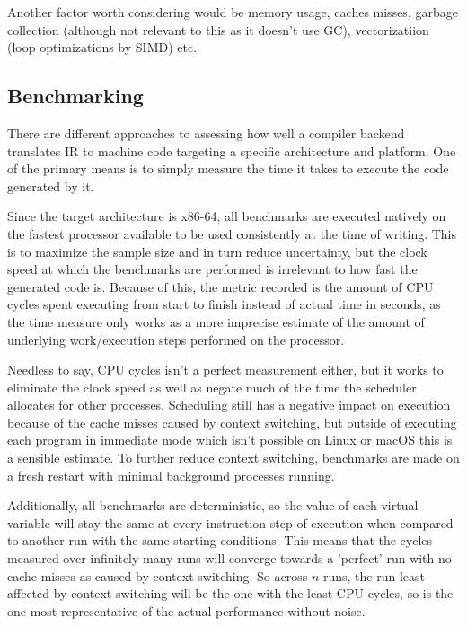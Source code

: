 \documentclass{article}
\begin{document}

Another factor worth considering would be memory usage, caches misses, garbage collection (although not relevant to this as it doesn't use GC), vectorizatiion (loop optimizations by SIMD) etc.

\newpage
\subsection{Benchmarking}


There are different approaches to assessing how well a compiler backend translates IR to machine code targeting a specific architecture and platform. One of the primary means is to simply measure the time it takes to execute the code generated by it.

Since the target architecture is x86-64, all benchmarks are executed natively on the fastest processor available to be used consistently at the time of writing. This is to maximize the sample size and in turn reduce uncertainty, but the clock speed at which the benchmarks are performed is irrelevant to how fast the generated code is. Because of this, the metric recorded is the amount of CPU cycles spent executing from start to finish instead of actual time in seconds, as the time measure only works as a more imprecise estimate of the amount of underlying work/execution steps performed on the processor.

Needless to say, CPU cycles isn't a perfect measurement either, but it works to eliminate the clock speed as well as negate much of the time the scheduler allocates for other processes. Scheduling still has a negative impact on execution because of the cache misses caused by context switching, but outside of executing each program in immediate mode which isn't possible on Linux or macOS this is a sensible estimate. To further reduce context switching, benchmarks are made on a fresh restart with minimal background processes running.

Additionally, all benchmarks are deterministic, so the value of each virtual variable will stay the same at every instruction step of execution when compared to another run with the same starting conditions. %
This means that the cycles measured over infinitely many runs will converge towards a 'perfect' run with no cache misses as caused by context switching. So across \(n\) runs, the run least affected by context switching will be the one with the least CPU cycles, so is the one most representative of the actual performance without noise.
\end{document}
